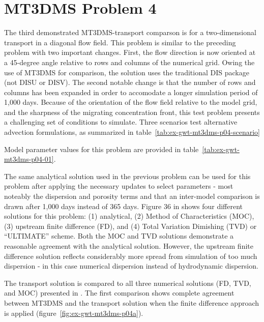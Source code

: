 \section{MT3DMS Problem 4}

The third demonstrated MT3DMS-\mf transport comparson is for a two-dimensional transport in a diagonal flow field. This problem is similar to the preceding problem with two important changes. First, the flow direction is now oriented at a 45-degree angle relative to rows and columns of the numerical grid. Owing the use of MT3DMS for comparison, the \mf solution uses the traditional DIS package (not DISU or DISV).  The second notable change is that the number of rows and columns has been expanded in order to accomodate a longer simulation period of 1,000 days. Because of the orientation of the flow field relative to the model grid, and the sharpness of the migrating concentration front, this test problem presents a challenging set of conditions to simulate. Three scenarios test alternative advection formulations, as summarized in table~\ref{tab:ex-gwt-mt3dms-p04-scenario}



Model parameter values for this problem are provided in table~\ref{tab:ex-gwt-mt3dms-p04-01}.



The same analytical solution used in the previous problem can be used for this problem after applying the necessary updates to select parameters - most noteably the dispersion and porosity terms and that an inter-model comparison is drawn after 1,000 days instead of 365 days. Figure 36 in \cite{zheng1999mt3dms} shows four different solutions for this problem: (1) analytical, (2) Method of Characteristics (MOC), (3) upstream finite difference (FD), and (4) Total Variation Dimishing (TVD) or ``ULTIMATE'' scheme.  Both the MOC and TVD solutions demonstrate a reasonable agreement with the analytical solution. However, the upstream finite difference solution reflects considerably more spread from simulation of too much dispersion - in this case numerical dispersion instead of hydrodynamic dispersion. 

The \mf transport solution is compared to all three numerical solutions (FD, TVD, and MOC) presented in \cite{zheng1999mt3dms}. The first comparison shows complete agreement between MT3DMS and the \mf transport solution when the finite difference approach is applied (figure~\ref{fig:ex-gwt-mt3dms-p04a}). 

